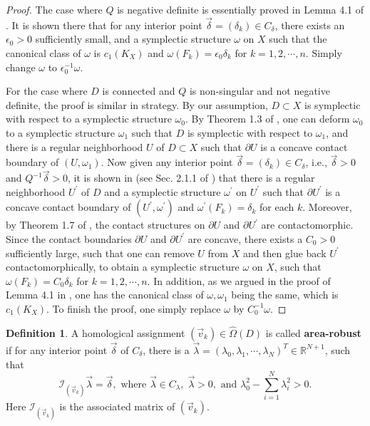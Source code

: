 \documentclass[11pt]{amsart}
\theoremstyle{plain}
\numberwithin{theorem}{section}
\theoremstyle{definition}
\newtheorem{definition}[theorem]{Definition}
\newcommand{\R}{{\mathbb R}}
\newcommand{\I}{{\mathcal I}}
\begin{document}
\begin{proof}
The case where $Q$ is negative definite is essentially proved in Lemma 4.1 of \cite{C}. It is shown 
there that for any interior point $\vec{\delta}=(\delta_k)\in C_\delta$, there exists an
$\epsilon_0>0$ sufficiently small, and a symplectic structure $\omega$ on $X$ such that the canonical class of 
$\omega$ is $c_1(K_X)$ and $\omega(F_k)=\epsilon_0\delta_k$ for $k=1,2,\cdots,n$. 
Simply change $\omega$ to $\epsilon_0^{-1}\omega$. 

For the case where $D$ is connected and $Q$ is non-singular and not negative definite, the proof is similar in strategy. By our assumption, $D\subset X$ is symplectic with respect to a symplectic structure $\omega_0$. By Theorem 1.3 of \cite{LM}, one can deform 
$\omega_0$ to a symplectic structure $\omega_1$ such that $D$ is symplectic with respect to 
$\omega_1$, and there is a regular neighborhood $U$ of $D\subset X$ such that $\partial U$ 
is a concave contact boundary of $(U,\omega_1)$. Now given any interior point 
$\vec{\delta}=(\delta_k)\in C_\delta$, i.e., $\vec{\delta}>0$ and $Q^{-1}\vec{\delta}>0$, 
it is shown in \cite{LM} (see Sec. 2.1.1 of \cite{LM}) that there is a regular neighborhood 
$U^\prime$ of $D$ and a symplectic structure $\omega^\prime$ on $U^\prime$ such that 
$\partial U^\prime$ is a concave contact boundary of $(U^\prime,\omega^\prime)$ and 
$\omega^\prime(F_k)=\delta_k$ for each $k$. Moreover, by Theorem 1.7 of \cite{LM}, the contact structures on $\partial U$ and $\partial U^\prime$ are contactomorphic. Since the contact boundaries 
$\partial U$ and $\partial U^\prime$ are concave, there exists a $C_0>0$ sufficiently large, such that
one can remove $U$ from $X$ and then glue back $U^\prime$ contactomorphically, to obtain a
symplectic structure $\omega$ on $X$, such that $\omega(F_k)=C_0\delta_k$ for 
$k=1,2,\cdots,n$. In addition, as we argued in the proof of Lemma 4.1 in \cite{C}, 
one has the canonical class of $\omega, \omega_1$ being the same, which is $c_1(K_X)$.
To finish the proof, one simply replace $\omega$ by $C_0^{-1}\omega$. 

\end{proof} 

\begin{definition}
A homological assignment $(\vec{v}_k)\in\hat{\Omega}(D)$ is called {\bf area-robust} if for 
any interior point $\vec{\delta}$ of ${C}_\delta$, there is a $\vec{\lambda}=(\lambda_0,\lambda_1,\cdots,\lambda_N)^T\in\R^{N+1}$, such that
$$
\I_{(\vec{v}_k)}\vec{\lambda}=\vec{\delta}, \mbox{ where }\vec{\lambda}\in C_\lambda, \; \vec{\lambda}>0, 
\mbox{ and } \lambda_0^2-\sum_{i=1}^N\lambda_i^2>0.
$$
Here $\I_{(\vec{v}_k)}$ is the associated matrix of $(\vec{v}_k)$.
\end{definition}
\end{document}
